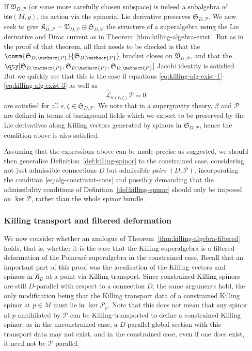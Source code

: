 \documentclass[pdftex]{sigma}
\numberwithin{equation}{section}
\newcommand{\fiso}{\mathfrak{iso}}
\newcommand{\fK}{\mathfrak{K}}
\newcommand{\fS}{\mathfrak{S}}
\newcommand{\fV}{\mathfrak{V}}
\newcommand{\eL}{\mathscr{L}}
\newcommand{\eP}{\mathscr{P}}
\newcommand{\eLhat}{\widehat{\eL}}
\newcommand{\1}{\mathbbm{1}}
\begin{document}
If $\fV_{D,\eP}$ (or some more carefully chosen subspace) is indeed a subalgebra of $\fiso(M,g)$, its action via the spinorial Lie derivative preserves $\fS_{D,\eP}$.
We now seek to give $\fK_{D,\eP} = \fV_{D,\eP}\oplus\fS_{D,\eP}$ the structure of a superalgebra using the Lie derivative and Dirac current as in Theorem~\ref{thm:killing-algebra-exist}. But as in the proof of that theorem, all that needs to be checked is that the $\comm{\fS_{D,\eP}}{\fS_{D,\eP}}$ bracket closes on $\fV_{D,\eP}$, and that the $\qty[\fS_{D,\eP},\fS_{D,\eP},\fS_{D,\eP}]$ Jacobi identity is satisfied. But we quickly see that this is the case if equations \eqref{eq:killing-alg-exist-1}--\eqref{eq:killing-alg-exist-3} as well as
\begin{equation}\label{eq:alg-constraint-cons}
	\eLhat_{\kappa(\epsilon,\zeta)}\eP = 0
\end{equation}
are satisfied for all $\epsilon,\zeta\in\fS_{D,\eP}$. We note that in a supergravity theory, $\beta$ and $\eP$ are defined in terms of background fields which we expect to be preserved by the Lie derivatives along Killing vectors generated by spinors in $\fS_{D,\eP}$, hence the condition above is also satisfied.

Assuming that the expressions above can be made precise as suggested, we should then generalise Definition~\ref{def:killing-spinor} to the constrained case, considering not just admissible connections $D$ but admissible \emph{pairs} $(D,\eP)$, incorporating the condition \eqref{eq:alg-constraint-cons} and possibly demanding that the admissibility conditions of Definition~\ref{def:killing-spinor} should only be imposed on $\ker\eP$, rather than the whole spinor bundle.

\subsubsection{Killing transport and filtered deformation}

We now consider whether an analogue of Theorem~\ref{thm:killing-algebra-filtered} holds, that is, whether it is the case that the Killing superalgebra is a filtered deformation of the Poincar\'e superalgebra in the constrained case. Recall that an important part of this proof was the localisation of the Killing vectors and spinors in $\fK_D$ at a point via Killing transport. Since constrained Killing spinors are still $D$-parallel with respect to a connection $D$, the same arguments hold, the only modification being that the Killing transport data of a constrained Killing spinor at $p\in M$ must lie in $\ker\eP_p$. Note that this does not mean that any spinor at $p$ annihilated by $\eP$ can be Killing-transported to define a constrained Killing spinor; as in the unconstrained case, a $D$-parallel global section with this transport data may not exist, and in the constrained case, even if one does exist, it need not be $\eP$-parallel.
\end{document}
